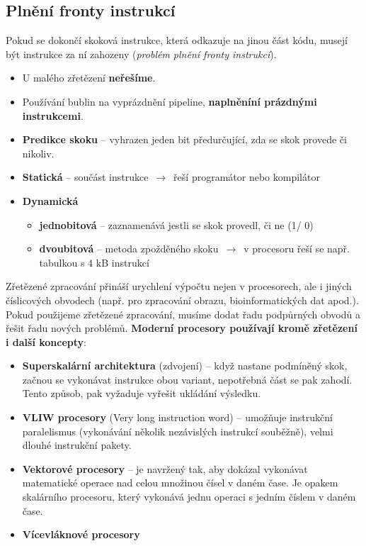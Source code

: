 \subsection{Plnění fronty instrukcí}
Pokud se dokončí skoková instrukce, která odkazuje na jinou část kódu, musejí být instrukce za ní zahozeny (\textit{problém plnění fronty instrukcí}).
\begin{itemize}
    \item{U malého zřetězení \textbf{neřešíme}}.
    \item{Používání bublin na vyprázdnění pipeline, \textbf{naplněníní prázdnými instrukcemi}}.
    \item{\textbf{Predikce skoku} -- vyhrazen jeden bit předurčující, zda se skok provede či nikoliv}.
\end{itemize}
\begin{itemize}
    \item{\textbf{Statická} -- součást instrukce $\,\to\,$ řeší programátor nebo kompilátor}
    \item{\textbf{Dynamická}
          \begin{itemize}
              \item{\textbf{jednobitová} -- zaznamenává jestli se skok provedl, či ne (1/ 0)}
              \item{\textbf{dvoubitová} -- metoda zpožděného skoku $\,\to\,$ v procesoru řeší se např. tabulkou s 4 kB instrukcí}
          \end{itemize}
          }
\end{itemize}
Zřetězené zpracování přináší urychlení výpočtu nejen v procesorech, ale i jiných číslicových obvodech (např. pro zpracování obrazu, bioinformatických dat apod.). Pokud použijeme zřetězené zpracování, musíme dodat řadu podpůrných obvodů a řešit řadu nových problémů. \textbf{Moderní procesory používají kromě zřetězení i další koncepty}:
\begin{itemize}
    \item{\textbf{Superskalární architektura} (zdvojení) -- když nastane podmíněný skok, začnou se vykonávat instrukce obou variant, nepotřebná část se pak zahodí. Tento způsob, pak vyžaduje vyřešit ukládání výsledku.}
    \item{\textbf{VLIW procesory} (Very long instruction word) -- umožňuje instrukční paralelismus (vykonávání několik nezávislých instrukcí souběžně), velmi dlouhé instrukční pakety}.
    \item{\textbf{Vektorové procesory} -- je navržený tak, aby dokázal vykonávat matematické operace nad celou množinou čísel v daném čase. Je opakem skalárního procesoru, který vykonává jednu operaci s jedním číslem v daném čase. }
    \item{\textbf{Vícevláknové procesory} }
\end{itemize}
